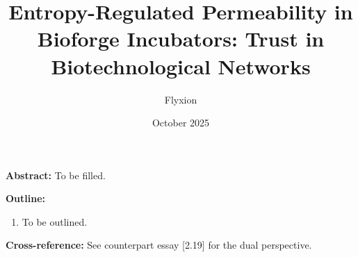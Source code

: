 \documentclass[12pt,a4paper]{article}
\title{Entropy-Regulated Permeability in Bioforge Incubators: Trust in Biotechnological Networks}
\author{Flyxion}
\date{October 2025}
\begin{document}
\maketitle
\textbf{Abstract:} To be filled.

\bigskip
\textbf{Outline:}
\begin{enumerate}
\item To be outlined.
\end{enumerate}

\bigskip
\textbf{Cross-reference:} See counterpart essay [2.19] for the dual perspective.
\end{document}
